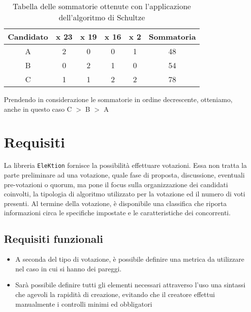 \documentclass[12pt,a4paper,openright,twoside]{book}
\begin{document}
\begin{table}[H]
    \centering
    \begin{tabular}{|c|c|c|c|c|c|}
    \hline
    \multicolumn{1}{|l|}{Candidato} & \multicolumn{1}{|l|}{x 23} & \multicolumn{1}{|l|}{x 19} & \multicolumn{1}{l|}{x 16} & \multicolumn{1}{l|}{x 2} & \multicolumn{1}{l|}{Sommatoria} \\ \hline
    A & 2 & 0 & 0 & 1 & 48                              \\ \hline
    B & 0 & 2 & 1 & 0 & 54                              \\ \hline
    C & 1 & 1 & 2 & 2 & 78                             \\ \hline
  
    \end{tabular}
    \caption{Tabella delle sommatorie ottenute con l'applicazione dell'algoritmo di Schultze}
    \label{table:risultatischultze}
\end{table}

Prendendo in considerazione le sommatorie in ordine decrescente, otteniamo, anche in questo caso C $>$ B $>$ A

\section{Requisiti}
La libreria \texttt{EleKtion} fornisce la possibilità effettuare votazioni.
Essa non tratta la parte preliminare ad una votazione, quale fase di proposta, discussione,
eventuali pre-votazioni o quorum, ma pone il focus sulla organizzazione dei candidati coinvolti,
la tipologia di algoritmo utilizzato per la votazione ed il numero di voti presenti.
Al termine della votazione, è disponibile una classifica che riporta informazioni 
circa le specifiche impostate e le caratteristiche dei concorrenti.

    \subsection{Requisiti funzionali}
    \begin{itemize}
        \item{A seconda del tipo di votazione, è possibile definire una metrica da utilizzare nel caso
        in cui si hanno dei pareggi.}
        \item{Sarà possibile definire tutti gli elementi necessari attraverso l'uso una sintassi che agevoli la rapidità di creazione,
        evitando che il creatore effettui manualmente i controlli minimi ed obbligatori}
    \end{itemize}
\end{document}

